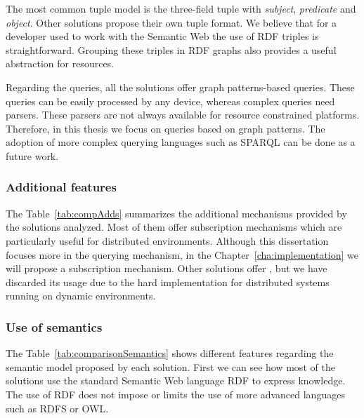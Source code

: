 The most common tuple model is the three-field tuple with \emph{subject}, \emph{predicate} and \emph{object}.
Other solutions propose their own tuple format.
We believe that for a developer used to work with the Semantic Web the use of RDF triples is straightforward.
Grouping these triples in RDF graphs also provides a useful abstraction for resources.

Regarding the queries, all the solutions offer graph patterns-based queries.
These queries can be easily processed by any device, whereas complex queries need parsers.
These parsers are not always available for resource constrained platforms.
Therefore, in this thesis we focus on queries based on graph patterns.
The adoption of more complex querying languages such as SPARQL can be done as a future work. %






\subsubsection{Additional features}

The Table~\ref{tab:compAdds} summarizes the additional mechanisms provided by the solutions analyzed.
Most of them offer subscription mechanisms which are particularly useful for distributed environments.
Although this dissertation focuses more in the querying mechanism, in the Chapter~\ref{cha:implementation} we will propose a subscription mechanism.
Other solutions offer , but we have discarded its usage due to the hard implementation for distributed systems running on dynamic environments.






\subsubsection{Use of semantics}

The Table~\ref{tab:comparisonSemantics} shows different features regarding the semantic model proposed by each solution.
First we can see how most of the solutions use the standard Semantic Web language RDF to express knowledge.
The use of RDF does not impose or limits the use of more advanced languages such as RDFS or OWL.

